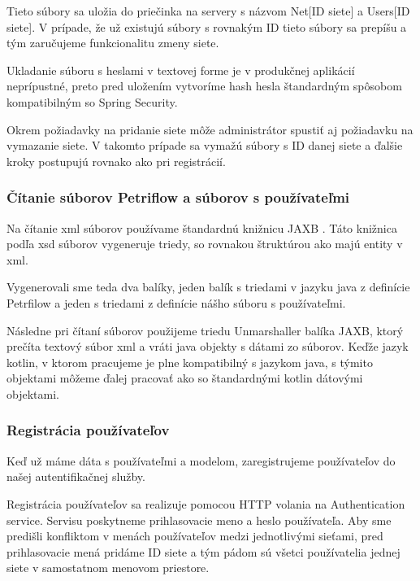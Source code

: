 Tieto súbory sa uložia do priečinka na servery s názvom Net[ID siete] a Users[ID siete]. V prípade, že už existujú súbory s rovnakým ID tieto súbory sa prepíšu a tým zaručujeme funkcionalitu zmeny siete.  

Ukladanie súboru s heslami v textovej forme je v produkčnej aplikácií neprípustné, preto pred uložením vytvoríme hash hesla štandardným spôsobom kompatibilným so Spring Security. 



Okrem požiadavky na pridanie siete môže administrátor spustiť aj požiadavku na vymazanie siete. V takomto prípade sa vymažú súbory s ID danej siete a ďalšie kroky postupujú rovnako ako pri registrácií. 





\subsubsection{Čítanie súborov Petriflow a súborov s používateľmi} 
Na čítanie \acrshort{xml} súborov používame štandardnú knižnicu JAXB \cite{jaxb}. Táto knižnica podľa \acrshort{xsd} súborov vygeneruje triedy, so rovnakou štruktúrou ako majú entity v \acrshort{xml}. 

Vygenerovali sme teda dva balíky, jeden balík s triedami v jazyku java z definície Petrfilow a jeden s triedami z definície nášho súboru s používateľmi.  

Následne pri čítaní súborov použijeme triedu Unmarshaller balíka JAXB, ktorý prečíta textový súbor \acrshort{xml} a vráti java objekty s dátami zo súborov. Keďže jazyk kotlin, v ktorom pracujeme je plne kompatibilný s jazykom java, s týmito objektami môžeme ďalej pracovať ako so štandardnými kotlin dátovými objektami. 



\subsubsection{Registrácia používateľov} 
Keď už máme dáta s používateľmi a modelom, zaregistrujeme používateľov do našej autentifikačnej služby. 

Registrácia používateľov sa realizuje pomocou HTTP volania na Authentication service. Servisu poskytneme prihlasovacie meno a heslo používateľa. Aby sme predišli konfliktom v menách používateľov medzi jednotlivými sieťami, pred prihlasovacie mená pridáme ID siete a tým pádom sú všetci používatelia jednej siete v samostatnom menovom priestore. 


